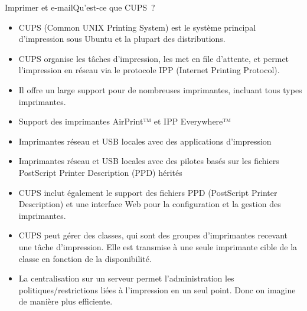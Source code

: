 \documentclass{beamer}
\begin{document}
    \begin{frame}{Imprimer et e-mail}{Qu'est-ce que CUPS~?}
        \begin{footnotesize}
            \begin{itemize}
                \item CUPS (Common UNIX Printing System) est le système principal d'impression sous Ubuntu et la plupart des distributions.
                \item CUPS organise les tâches d'impression, les met en file d'attente, et permet l'impression en réseau via le protocole IPP (Internet Printing Protocol).
                \item Il offre un large support pour de nombreuses imprimantes, incluant tous types imprimantes.
                \item Support des imprimantes AirPrint™ et IPP Everywhere™
                \item Imprimantes réseau et USB locales avec des applications d'impression
                \item Imprimantes réseau et USB locales avec des pilotes basés sur les fichiers PostScript Printer Description (PPD) hérités
                \item CUPS inclut également le support des fichiers PPD (PostScript Printer Description) et une interface Web pour la configuration et la gestion des imprimantes.
                \item CUPS peut gérer des classes, qui sont des groupes d'imprimantes recevant une tâche d'impression.
                Elle est transmise à une seule imprimante cible de la classe en fonction de la disponibilité.
                \item La centralisation sur un serveur permet l'administration les politiques/restrictions liées à l'impression en un seul point.
                Donc on imagine de manière plus efficiente.
            \end{itemize}
        \end{footnotesize}
    \end{frame}
\end{document}
